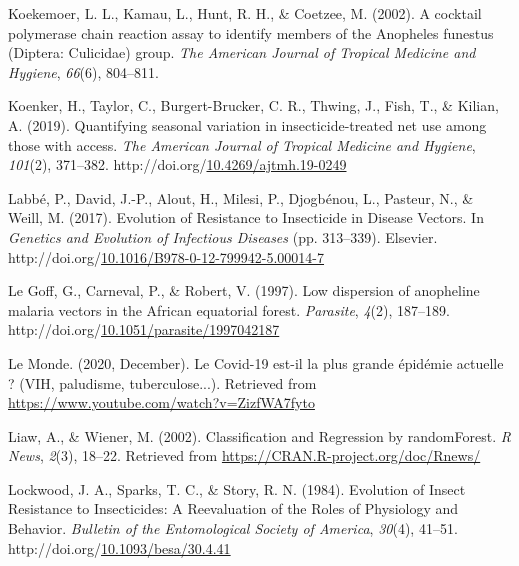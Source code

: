 \documentclass[12pt,twoside]{reedthesis}
\newlength{\cslhangindent}
\newenvironment{CSLReferences}[2] %
 {%
  \setlength{\parindent}{0pt}
  \ifodd #1 \everypar{\setlength{\hangindent}{\cslhangindent}}\ignorespaces\fi
  \ifnum #2 > 0
  \setlength{\parskip}{#2\baselineskip}
  \fi
 }%
 {}
\begin{document}
\begin{CSLReferences}{1}{0}
\leavevmode{}%
Koekemoer, L. L., Kamau, L., Hunt, R. H., \& Coetzee, M. (2002). A cocktail polymerase chain reaction assay to identify members of the {Anopheles} funestus ({Diptera}: {Culicidae}) group. \emph{The American Journal of Tropical Medicine and Hygiene}, \emph{66}(6), 804--811.

\leavevmode{}%
Koenker, H., Taylor, C., Burgert-Brucker, C. R., Thwing, J., Fish, T., \& Kilian, A. (2019). Quantifying seasonal variation in insecticide-treated net use among those with access. \emph{The American Journal of Tropical Medicine and Hygiene}, \emph{101}(2), 371--382. http://doi.org/\href{https://doi.org/10.4269/ajtmh.19-0249}{10.4269/ajtmh.19-0249}

\leavevmode{}%
Labbé, P., David, J.-P., Alout, H., Milesi, P., Djogbénou, L., Pasteur, N., \& Weill, M. (2017). Evolution of {Resistance} to {Insecticide} in {Disease} {Vectors}. In \emph{Genetics and {Evolution} of {Infectious} {Diseases}} (pp. 313--339). Elsevier. http://doi.org/\href{https://doi.org/10.1016/B978-0-12-799942-5.00014-7}{10.1016/B978-0-12-799942-5.00014-7}

\leavevmode{}%
Le Goff, G., Carneval, P., \& Robert, V. (1997). Low dispersion of anopheline malaria vectors in the {African} equatorial forest. \emph{Parasite}, \emph{4}(2), 187--189. http://doi.org/\href{https://doi.org/10.1051/parasite/1997042187}{10.1051/parasite/1997042187}

\leavevmode{}%
Le Monde. (2020, December). Le {Covid}-19 est-il la plus grande épidémie actuelle ? ({VIH}, paludisme, tuberculose...). Retrieved from \url{https://www.youtube.com/watch?v=ZizfWA7fyto}

\leavevmode{}%
Liaw, A., \& Wiener, M. (2002). Classification and {Regression} by {randomForest}. \emph{R News}, \emph{2}(3), 18--22. Retrieved from \url{https://CRAN.R-project.org/doc/Rnews/}

\leavevmode{}%
Lockwood, J. A., Sparks, T. C., \& Story, R. N. (1984). Evolution of {Insect} {Resistance} to {Insecticides}: {A} {Reevaluation} of the {Roles} of {Physiology} and {Behavior}. \emph{Bulletin of the Entomological Society of America}, \emph{30}(4), 41--51. http://doi.org/\href{https://doi.org/10.1093/besa/30.4.41}{10.1093/besa/30.4.41}


\end{CSLReferences}
\end{document}
